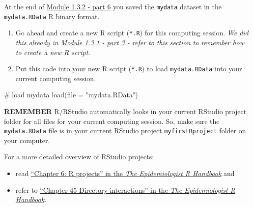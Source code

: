 \documentclass[
  letterpaper,
  DIV=11,
  numbers=noendperiod]{scrartcl}
\newenvironment{Shaded}{\begin{snugshade}}{\end{snugshade}}
\newcommand{\AttributeTok}[1]{\textcolor[rgb]{0.40,0.45,0.13}{#1}}
\newcommand{\CommentTok}[1]{\textcolor[rgb]{0.37,0.37,0.37}{#1}}
\newcommand{\FunctionTok}[1]{\textcolor[rgb]{0.28,0.35,0.67}{#1}}
\newcommand{\NormalTok}[1]{\textcolor[rgb]{0.00,0.23,0.31}{#1}}
\newcommand{\StringTok}[1]{\textcolor[rgb]{0.13,0.47,0.30}{#1}}
\providecommand{\tightlist}{%
  \setlength{\itemsep}{0pt}\setlength{\parskip}{0pt}}\usepackage{longtable,booktabs,array}
\begin{document}
At the end of
\href{module132_DataWrangling.html\#save-mydata-as-.rdata-native-r-binary-format}{Module
1.3.2 - part 6} you saved the \texttt{mydata} dataset in the
\texttt{mydata.RData} R binary format.

\begin{enumerate}
\def\labelenumi{\arabic{enumi}.}
\item
  Go ahead and create a new R script (\texttt{*.R}) for this computing
  session. \emph{We did this already in
  \href{module131_IntroRRStudio.html\#create-your-first-r-script}{Module
  1.3.1 - part 3} - refer to this section to remember how to create a
  new R script.}
\item
  Put this code into your new R script (\texttt{*.R}) to load
  \texttt{mydata.RData} into your current computing session.
\end{enumerate}

\begin{Shaded}
\begin{Highlighting}[]
\CommentTok{\# load mydata}
\FunctionTok{load}\NormalTok{(}\AttributeTok{file =} \StringTok{"mydata.RData"}\NormalTok{)}
\end{Highlighting}
\end{Shaded}

\begin{tcolorbox}[enhanced jigsaw, arc=.35mm, colback=white, rightrule=.15mm, toprule=.15mm, colframe=quarto-callout-important-color-frame, opacityback=0, breakable, titlerule=0mm, left=2mm, title=\textcolor{quarto-callout-important-color}{\faExclamation}\hspace{0.5em}{Data must/should be in your RStudio project}, toptitle=1mm, opacitybacktitle=0.6, bottomtitle=1mm, leftrule=.75mm, bottomrule=.15mm, coltitle=black, colbacktitle=quarto-callout-important-color!10!white]

\textbf{REMEMBER} R/RStudio automatically looks in your current RStudio
project folder for all files for your current computing session. So,
make sure the \texttt{mydata.RData} file is in your current RStudio
project \texttt{myfirstRproject} folder on your computer.

\medskip

For a more detailed overview of RStudio projects:

\begin{itemize}
\tightlist
\item
  read
  \href{https://epirhandbook.com/en/new_pages/r_projects.html}{``Chapter
  6: R projects'' in the \emph{The Epidemiologist R Handbook}} and
\item
  refer to
  \href{https://epirhandbook.com/en/new_pages/directories.html}{``Chapter
  45 Directory interactions'' in the \emph{The Epidemiologist R
  Handbook}}.
\end{itemize}

\end{tcolorbox}
\end{document}
